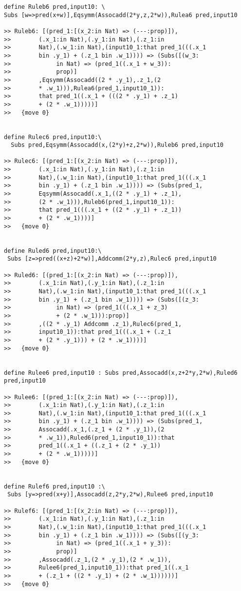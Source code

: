 \documentclass{article}
\begin{document}
\begin{verbatim}
define Ruleb6 pred,input10: \
Subs [w=>pred(x+w)],Eqsymm(Assocadd(2*y,z,2*w)),Rulea6 pred,input10

>> Ruleb6: [(pred_1:[(x_2:in Nat) => (---:prop)]),
>>        (.x_1:in Nat),(.y_1:in Nat),(.z_1:in 
>>        Nat),(.w_1:in Nat),(input10_1:that pred_1(((.x_1 
>>        bin .y_1) + (.z_1 bin .w_1)))) => (Subs([(w_3:
>>             in Nat) => (pred_1((.x_1 + w_3)):
>>             prop)]
>>        ,Eqsymm(Assocadd((2 * .y_1),.z_1,(2 
>>        * .w_1))),Rulea6(pred_1,input10_1)):
>>        that pred_1((.x_1 + (((2 * .y_1) + .z_1) 
>>        + (2 * .w_1)))))]
>>   {move 0}


define Rulec6 pred,input10:\
  Subs pred,Eqsymm(Assocadd(x,(2*y)+z,2*w)),Ruleb6 pred,input10

>> Rulec6: [(pred_1:[(x_2:in Nat) => (---:prop)]),
>>        (.x_1:in Nat),(.y_1:in Nat),(.z_1:in 
>>        Nat),(.w_1:in Nat),(input10_1:that pred_1(((.x_1 
>>        bin .y_1) + (.z_1 bin .w_1)))) => (Subs(pred_1,
>>        Eqsymm(Assocadd(.x_1,((2 * .y_1) + .z_1),
>>        (2 * .w_1))),Ruleb6(pred_1,input10_1)):
>>        that pred_1(((.x_1 + ((2 * .y_1) + .z_1)) 
>>        + (2 * .w_1))))]
>>   {move 0}


define Ruled6 pred,input10:\
 Subs [z=>pred((x+z)+2*w)],Addcomm(2*y,z),Rulec6 pred,input10  

>> Ruled6: [(pred_1:[(x_2:in Nat) => (---:prop)]),
>>        (.x_1:in Nat),(.y_1:in Nat),(.z_1:in 
>>        Nat),(.w_1:in Nat),(input10_1:that pred_1(((.x_1 
>>        bin .y_1) + (.z_1 bin .w_1)))) => (Subs([(z_3:
>>             in Nat) => (pred_1(((.x_1 + z_3) 
>>             + (2 * .w_1))):prop)]
>>        ,((2 * .y_1) Addcomm .z_1),Rulec6(pred_1,
>>        input10_1)):that pred_1(((.x_1 + (.z_1 
>>        + (2 * .y_1))) + (2 * .w_1))))]
>>   {move 0}


define Rulee6 pred,input10 : Subs pred,Assocadd(x,z+2*y,2*w),Ruled6 pred,input10

>> Rulee6: [(pred_1:[(x_2:in Nat) => (---:prop)]),
>>        (.x_1:in Nat),(.y_1:in Nat),(.z_1:in 
>>        Nat),(.w_1:in Nat),(input10_1:that pred_1(((.x_1 
>>        bin .y_1) + (.z_1 bin .w_1)))) => (Subs(pred_1,
>>        Assocadd(.x_1,(.z_1 + (2 * .y_1)),(2 
>>        * .w_1)),Ruled6(pred_1,input10_1)):that 
>>        pred_1((.x_1 + ((.z_1 + (2 * .y_1)) 
>>        + (2 * .w_1)))))]
>>   {move 0}


define Rulef6 pred,input10 :\
 Subs [y=>pred(x+y)],Assocadd(z,2*y,2*w),Rulee6 pred,input10

>> Rulef6: [(pred_1:[(x_2:in Nat) => (---:prop)]),
>>        (.x_1:in Nat),(.y_1:in Nat),(.z_1:in 
>>        Nat),(.w_1:in Nat),(input10_1:that pred_1(((.x_1 
>>        bin .y_1) + (.z_1 bin .w_1)))) => (Subs([(y_3:
>>             in Nat) => (pred_1((.x_1 + y_3)):
>>             prop)]
>>        ,Assocadd(.z_1,(2 * .y_1),(2 * .w_1)),
>>        Rulee6(pred_1,input10_1)):that pred_1((.x_1 
>>        + (.z_1 + ((2 * .y_1) + (2 * .w_1))))))]
>>   {move 0}



\end{verbatim}
\end{document}

